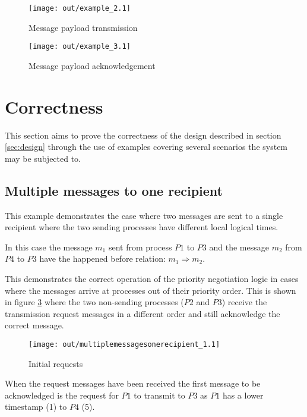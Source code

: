 \documentclass[twocolumn]{article}
\begin{document}
\begin{figure}[h!]
  \centering
  \texttt{[image: out/example\_2.1]}
  \caption{Message payload transmission}
  \label{fig:example_2}
\end{figure}
\FloatBarrier

\begin{figure}[h!]
  \centering
  \texttt{[image: out/example\_3.1]}
  \caption{Message payload acknowledgement}
  \label{fig:example_3}
\end{figure}
\FloatBarrier

\section{Correctness}
\label{sec:correctness}

This section aims to prove the correctness of the design described in section
\ref{sec:design} through the use of examples covering several scenarios the
system may be subjected to.

\subsection{Multiple messages to one recipient}

This example demonstrates the case where two messages are sent to a single
recipient where the two sending processes have different local logical times.

In this case the message $m_{1}$ sent from process $P1$ to $P3$ and the message
$m_{2}$ from $P4$ to $P3$ have the happened before relation: $m_{1} \Rightarrow
m_{2}$.

This demonstrates the correct operation of the priority negotiation logic in
cases where the messages arrive at processes out of their priority order. This
is shown in figure \ref{fig:multiplemessagesonerecipient_1} where the two
non-sending processes ($P2$ and $P3$) receive the transmission request messages
in a different order and still acknowledge the correct message.

\begin{figure}[h!]
  \centering
  \texttt{[image: out/multiplemessagesonerecipient\_1.1]}
  \caption{Initial requests}
  \label{fig:multiplemessagesonerecipient_1}
\end{figure}
\FloatBarrier

When the request messages have been received the first message to be
acknowledged is the request for $P1$ to transmit to $P3$ as $P1$ has a lower
timestamp (1) to $P4$ (5).
\end{document}
